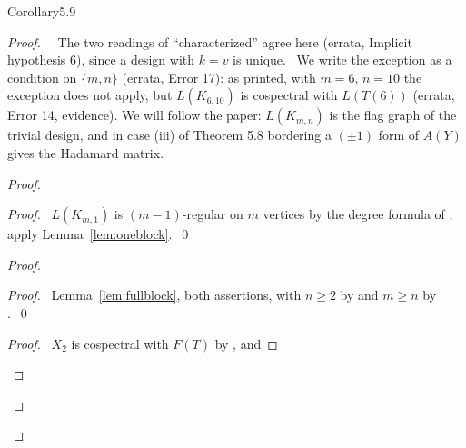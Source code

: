 \begin{cgss}{Corollary}{5.9}\label{cor:5.9}
\end{cgss}
\begin{proof}
 \pfsketch\ \repair\ The two readings of ``characterized'' agree here (errata, Implicit
 hypothesis 6), since a design with $k=v$ is unique. \repair\ We write the exception as a
 condition on $\{m,n\}$ (errata, Error 17): as printed, with $m=6$, $n=10$ the exception does not
 apply, but $L(K_{6,10})$ is cospectral with $L(T(6))$ (errata, Error 14, evidence). We will follow the paper: $L(K_{m,n})$
 is the flag graph of the trivial design, and in case (iii) of Theorem 5.8 bordering a
 $(\pm1)$ form of $A(Y)$ gives the Hadamard matrix.
 \begin{proof}
  \begin{proof}\pf\ $L(K_{m,1})$ is $(m-1)$-regular on $m$ vertices by the degree formula of
   ; apply Lemma~\ref{lem:oneblock}.~\qed\end{proof}
  \begin{proof}
   \begin{proof}\pf\ Lemma~\ref{lem:fullblock}, both assertions, with $n\ge2$ by  and
    $m\ge n$ by .~\qed\end{proof}
   \begin{proof}\pf\ $X_2$ is cospectral with $F(T)$ by ,  and

\end{proof}
\end{proof}
\end{proof}
\end{proof}
